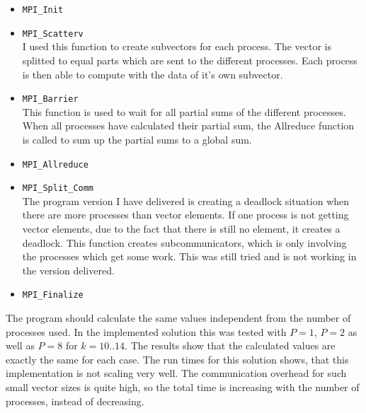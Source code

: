 \documentclass{article}
\begin{document}
\begin{itemize}
\item \texttt{MPI\_Init}
\item \texttt{MPI\_Scatterv}\\
I used this function to create subvectors for each process. The vector is splitted to equal parts which are sent to the different processes. Each process is then able to compute with the data of it's own subvector.
\item \texttt{MPI\_Barrier}\\
This function is used to wait for all partial sums of the different processes. When all processes have calculated their partial sum, the Allreduce function is called to sum up the partial sums to a global sum.
\item \texttt{MPI\_Allreduce}
\item \texttt{MPI\_Split\_Comm}\\
The program version I have delivered is creating a deadlock situation when there are more processes than vector elements. If one process is not getting vector elements, due to the fact that there is still no element, it creates a deadlock. This function creates subcommunicators, which is only involving the processes which get some work. This was still tried and is not working in the version delivered.
\item \texttt{MPI\_Finalize}
\end{itemize}
The program should calculate the same values independent from the number of processes used. In the implemented solution this was tested with $P=1$, $P=2$ as well as $P=8$ for $k=10..14$. The results show that the calculated values are exactly the same for each case. The run times for this solution shows, that this implementation is not scaling very well. The communication overhead for such small vector sizes is quite high, so the total time is increasing with the number of processes, instead of decreasing.
\end{document}
